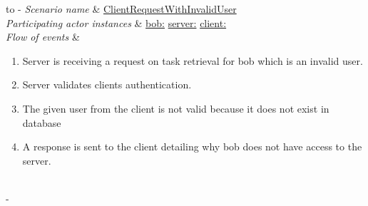 \documentclass{article}
\begin{document}
%
%
\begin{table}[h!]
	\tabulinesep=1.5mm
	\begin{tabu} to 
		\tabucline[1.5pt]-
		\textit{Scenario name} & \underline{ClientRequestWithInvalidUser} \\
		\hline
		\textit{Participating actor \newline instances} & 
		\underline{bob:\invalidUser}
		\newline \underline{server:\serverside}
		\newline \underline{client:\clientside} \\
		\hline
		\textit{Flow of events} &
		\vspace{-3mm}
		\begin{enumerate}[leftmargin=*,topsep=0pt,itemsep=-1ex]
			\item Server is receiving a request on task retrieval for bob which is an invalid user.
			
			\item Server validates clients authentication. 
			
			\item The given user from the client is not valid because it does not exist in database
			
			\item A response is sent to the client detailing why bob does not have access to the server. \\
			
		\end{enumerate} \\
		\tabucline[1.5pt]-
	\end{tabu}
	\caption{Scenario when a invalid user is trying to get access to the server.}
	\label{sc:ClientRequestWithInvalidUser}
\end{table}
\end{document}
